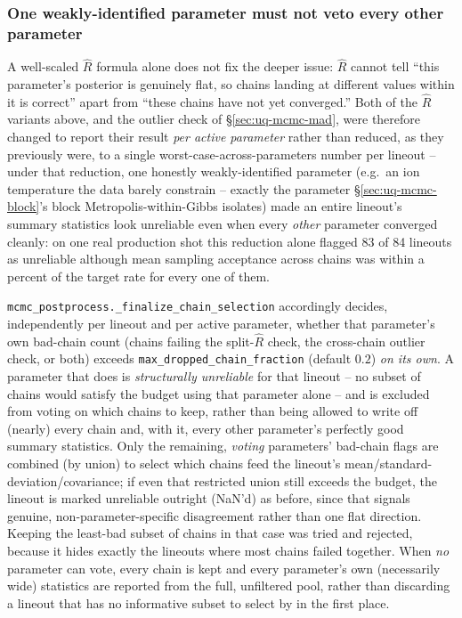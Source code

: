 \documentclass[11pt]{article}
\newcommand{\code}[1]{\texttt{#1}}
\begin{document}
\subsubsection{One weakly-identified parameter must not veto every other parameter}

A well-scaled $\hat R$ formula alone does not fix the deeper issue: $\hat R$ cannot tell
``this parameter's posterior is genuinely flat, so chains landing at different values
within it is correct'' apart from ``these chains have not yet converged.'' Both of the
$\hat R$ variants above, and the outlier check of \S\ref{sec:uq-mcmc-mad}, were
therefore changed to report their result \emph{per active parameter} rather than reduced,
as they previously were, to a single worst-case-across-parameters number per lineout --
under that reduction, one honestly weakly-identified parameter (e.g.\ an ion temperature
the data barely constrain -- exactly the parameter \S\ref{sec:uq-mcmc-block}'s block
Metropolis-within-Gibbs isolates) made an entire lineout's summary statistics look
unreliable even when every \emph{other} parameter converged cleanly: on one real
production shot this reduction alone flagged 83 of 84 lineouts as unreliable although
mean sampling acceptance across chains was within a percent of the target rate for every
one of them.

\code{mcmc\_postprocess.\_finalize\_chain\_selection} accordingly decides, independently
per lineout and per active parameter, whether that parameter's own bad-chain count (chains
failing the split-$\hat R$ check, the cross-chain outlier check, or both) exceeds
\code{max\_dropped\_chain\_fraction} (default $0.2$) \emph{on its own}. A parameter that does is
\emph{structurally unreliable} for that lineout -- no subset of chains would satisfy the
budget using that parameter alone -- and is excluded from voting on which chains to keep,
rather than being allowed to write off (nearly) every chain and, with it, every other
parameter's perfectly good summary statistics. Only the remaining, \emph{voting}
parameters' bad-chain flags are combined (by union) to select which chains feed the
lineout's mean/standard-deviation/covariance; if even that restricted union still exceeds
the budget, the lineout is marked unreliable outright (NaN'd) as before, since that
signals genuine, non-parameter-specific disagreement rather than one flat direction.
Keeping the least-bad subset of chains in that case was tried and rejected, because it
hides exactly the lineouts where most chains failed together.
When \emph{no} parameter can vote, every chain is kept and every parameter's own
(necessarily wide) statistics are reported from the full, unfiltered pool, rather than
discarding a lineout that has no informative subset to select by in the first place.
\end{document}
